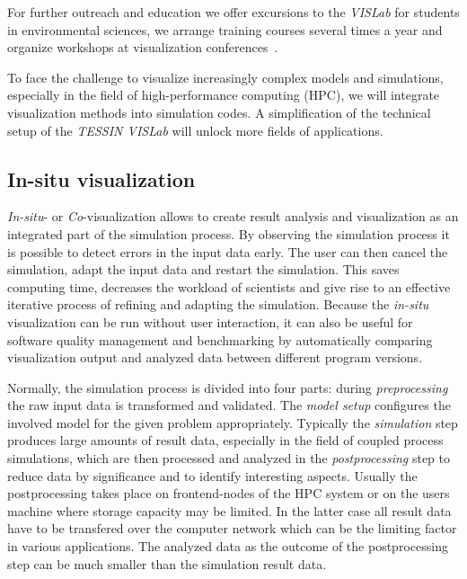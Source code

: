 \documentclass[twocolumn]{svjour3}          %
\begin{document}
For further outreach and education we offer excursions to the \emph{VISLab} for students in environmental sciences, we arrange training courses several times a year and organize workshops at visualization conferences~\cite{web:envirvis}.

To face the challenge to visualize increasingly complex models and simulations, especially in the field of high-performance computing (HPC), we will integrate visualization methods into simulation codes. A simplification of the technical setup of the \emph{TESSIN VISLab} will unlock more fields of applications.

\subsection{In-situ visualization}
\label{in-situ-visualization}

\emph{In-situ}- or \emph{Co}-visualization allows to create result analysis and visualization as an integrated part of the simulation process. By observing the simulation process it is possible to detect errors in the input data early. The user can then cancel the simulation, adapt the input data and restart the simulation. This saves computing time, decreases the workload of scientists and give rise to an effective iterative process of refining and adapting the simulation. Because the \emph{in-situ} visualization can be run without user interaction, it can also be useful for software quality management and benchmarking by automatically comparing visualization output and analyzed data between different program versions.

Normally, the simulation process is divided into four parts: during \emph{preprocessing} the raw input data is transformed and validated. The \emph{model setup} configures the involved model for the given problem appropriately. Typically the \emph{simulation} step produces large amounts of result data, especially in the field of coupled process simulations, which are then processed and analyzed in the \emph{postprocessing} step to reduce data by significance and to identify interesting aspects. Usually the postprocessing takes place on frontend-nodes of the HPC system or on the users machine where storage capacity may be limited. In the latter case all result data have to be transfered over the computer network which can be the limiting factor in various applications. The analyzed data as the outcome of the postprocessing step can be much smaller than the simulation result data.
\end{document}

